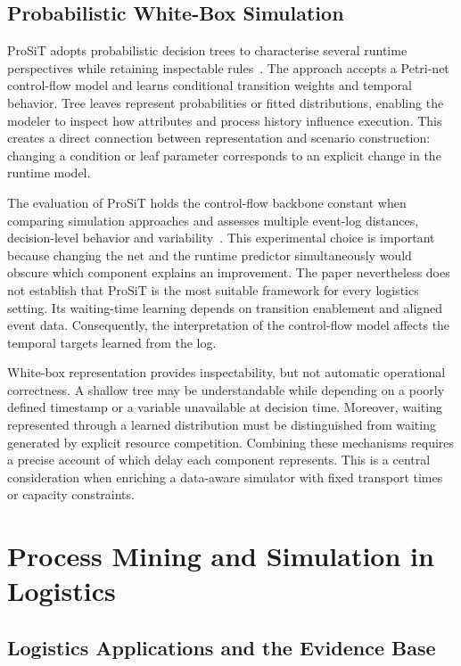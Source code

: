 \subsection{Probabilistic White-Box Simulation}

ProSiT adopts probabilistic decision trees to characterise several runtime perspectives while retaining inspectable rules~\cite{Vinci2026prosit}. The approach accepts a Petri-net control-flow model and learns conditional transition weights and temporal behavior. Tree leaves represent probabilities or fitted distributions, enabling the modeler to inspect how attributes and process history influence execution. This creates a direct connection between representation and scenario construction: changing a condition or leaf parameter corresponds to an explicit change in the runtime model.

The evaluation of ProSiT holds the control-flow backbone constant when comparing simulation approaches and assesses multiple event-log distances, decision-level behavior and variability~\cite{Vinci2026prosit}. This experimental choice is important because changing the net and the runtime predictor simultaneously would obscure which component explains an improvement. The paper nevertheless does not establish that ProSiT is the most suitable framework for every logistics setting. Its waiting-time learning depends on transition enablement and aligned event data. Consequently, the interpretation of the control-flow model affects the temporal targets learned from the log.

White-box representation provides inspectability, but not automatic operational correctness. A shallow tree may be understandable while depending on a poorly defined timestamp or a variable unavailable at decision time. Moreover, waiting represented through a learned distribution must be distinguished from waiting generated by explicit resource competition. Combining these mechanisms requires a precise account of which delay each component represents. This is a central consideration when enriching a data-aware simulator with fixed transport times or capacity constraints.

\section{Process Mining and Simulation in Logistics}
\label{sec:rw_logistics}

\subsection{Logistics Applications and the Evidence Base}

